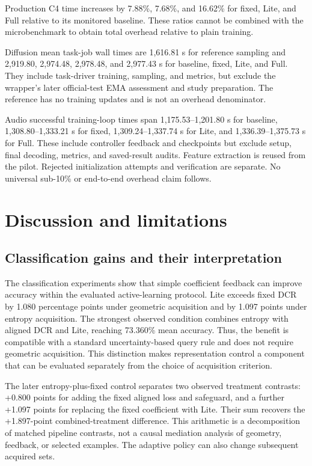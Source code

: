 \documentclass[a4paper,fleqn]{cas-dc}
\begin{document}
Production C4 time increases by 7.88\%, 7.68\%, and 16.62\%
for fixed, Lite, and Full relative to its monitored baseline.
These ratios cannot be combined with the microbenchmark
to obtain total overhead relative to plain training.

Diffusion mean task-job wall times are 1,616.81 s for
reference sampling and 2,919.80, 2,974.48, 2,978.48,
and 2,977.43 s for baseline, fixed, Lite, and Full.
They include task-driver training, sampling, and metrics,
but exclude the wrapper's later official-test EMA assessment
and study preparation. The reference has no training updates
and is not an overhead denominator.

Audio successful training-loop times span
1,175.53--1,201.80 s for baseline,
1,308.80--1,333.21 s for fixed,
1,309.24--1,337.74 s for Lite, and
1,336.39--1,375.73 s for Full.
These include controller feedback and checkpoints but exclude
setup, final decoding, metrics, and saved-result audits.
Feature extraction is reused from the pilot.
Rejected initialization attempts and verification are separate.
No universal sub-10\% or end-to-end overhead claim follows.


\FloatBarrier
\section{Discussion and limitations}\label{sec:discussion}

\subsection{Classification gains and their interpretation}

The classification experiments show that simple coefficient feedback
can improve accuracy within the evaluated active-learning protocol.
Lite exceeds fixed DCR by 1.080 percentage points under geometric
acquisition and by 1.097 points under entropy acquisition. The strongest
observed condition combines entropy with aligned DCR and Lite, reaching
73.360\% mean accuracy. Thus, the benefit is compatible with a standard
uncertainty-based query rule and does not require geometric acquisition.
This distinction makes representation control a component that can be
evaluated separately from the choice of acquisition criterion.

The later entropy-plus-fixed control separates two observed treatment
contrasts: +0.800 points for adding the fixed aligned loss and safeguard,
and a further +1.097 points for replacing the fixed coefficient with
Lite. Their sum recovers the +1.897-point combined-treatment difference.
This arithmetic is a decomposition of matched pipeline contrasts, not a
causal mediation analysis of geometry, feedback, or selected examples.
The adaptive policy can also change subsequent acquired sets.
\end{document}
